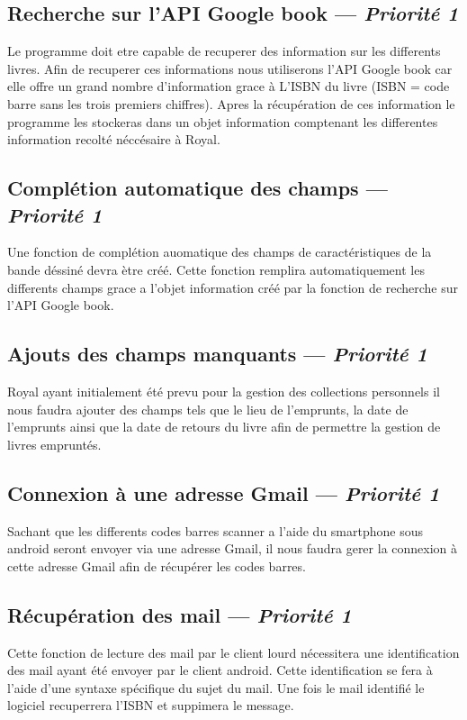 \subsection[Recherche sur l'API Google book]{Recherche sur l'API Google book — \emph{Priorité 1}}
Le programme doit etre capable de recuperer des information sur les differents livres. Afin de recuperer ces informations nous utiliserons l'API Google book car elle offre un grand nombre d'information grace à L'ISBN du livre (ISBN = code barre sans les trois premiers chiffres). Apres la récupération de ces information le programme les stockeras dans un objet information comptenant les differentes information recolté néccésaire à Royal.  

\subsection[Complétion automatique des champs]{Complétion automatique des champs — \emph{Priorité 1}}
Une fonction de complétion auomatique des champs de caractéristiques de la bande déssiné devra ètre créé. Cette fonction remplira automatiquement les differents champs grace a l'objet information créé par la fonction de recherche sur l'API Google book.

\subsection[Ajouts des champs manquants]{Ajouts des champs manquants — \emph{Priorité 1}}
Royal ayant initialement été prevu pour la gestion des collections personnels il nous faudra ajouter des champs tels que le lieu de l'emprunts, la date de l'emprunts ainsi que la date de retours du livre afin de permettre la gestion de livres empruntés. 

\subsection[Connexion à une adresse Gmail]{Connexion à une adresse Gmail — \emph{Priorité 1}} 
Sachant que les differents codes barres scanner a l'aide du smartphone sous android seront envoyer via une adresse Gmail, il nous faudra gerer la connexion à cette adresse Gmail afin de récupérer les codes barres.

\subsection[Récupération des mail]{Récupération des mail — \emph{Priorité 1}} 
Cette fonction de lecture des mail par le client lourd nécessitera une identification des mail ayant été envoyer par le client android. Cette identification se fera à l'aide d'une syntaxe spécifique du sujet du mail. Une fois le mail identifié le logiciel recuperrera l'ISBN et suppimera le message. 

